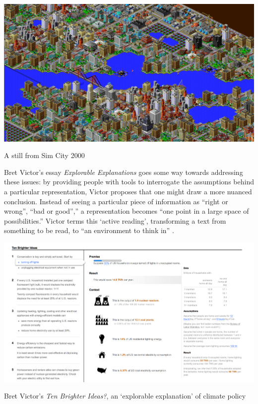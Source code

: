 \documentclass[nofonts,nols,justified,nobib]{tufte-book}
\begin{document}
\begin{marginfigure}
\includegraphics[width=\textwidth]{img/1/sim-city.png}
\caption{A still from Sim City 2000}
\end{marginfigure}

Bret Victor's essay \emph{Explorable Explanations} goes some way towards addressing these issues: by providing people with tools to interrogate the assumptions behind a particular representation, Victor proposes that one might draw a more nuanced conclusion. Instead of seeing a particular piece of information as ``right or wrong'', ``bad or good'','' a representation becomes ``one point in a large space of possibilities.'' Victor terms this `active reading', transforming a text from something to be read, to ``an environment to think in'' \cite{victor_explorable_2011}.

\begin{marginfigure}
\includegraphics[width=\textwidth]{img/1/ten-brighter-ideas.png}
\caption{Bret Victor's \emph{Ten Brighter Ideas?}, an `explorable explanation' of climate policy \cite{victor_ten_2010} }
\end{marginfigure}
\end{document}
